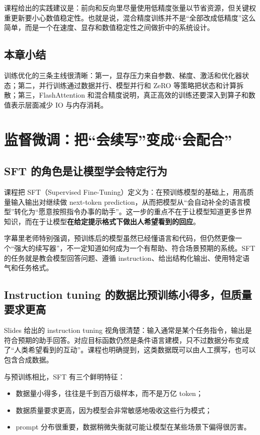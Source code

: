 \documentclass[a4paper]{article}
\begin{document}
课程给出的实践建议是：前向和反向里尽量使用低精度张量以节省资源，但关键权重更新要小心数值稳定性。也就是说，混合精度训练并不是“全部改成低精度”这么简单，而是一个在速度、显存和数值稳定性之间做折中的系统设计。

\subsection{本章小结}
训练优化的三条主线很清晰：第一，显存压力来自参数、梯度、激活和优化器状态；第二，并行训练通过数据并行、模型并行和 ZeRO 等策略把状态和计算拆散；第三，FlashAttention 和混合精度说明，真正高效的训练还要深入到算子和数值表示层面减少 IO 与内存消耗。

\section{监督微调：把“会续写”变成“会配合”}

\subsection{SFT 的角色是让模型学会特定行为}
课程把 SFT（Supervised Fine-Tuning）定义为：在预训练模型的基础上，用高质量输入输出对继续做 next-token prediction，从而把模型从“会自动补全的语言模型”转化为“愿意按照指令办事的助手”。这一步的重点不在于让模型知道更多世界知识，而在于让模型\textbf{在给定提示格式下做出人希望看到的回应}。

字幕里老师特别强调，预训练后的模型虽然已经懂语言和代码，但仍然更像一个“强大的续写器”，不一定知道如何成为一个有帮助、符合场景预期的系统。SFT 的任务就是教会模型回答问题、遵循 instruction、给出结构化输出、使用特定语气和任务格式。

\subsection{Instruction tuning 的数据比预训练小得多，但质量要求更高}
Slides 给出的 instruction tuning 视角很清楚：输入通常是某个任务指令，输出是符合预期的助手回答。对应目标函数仍然是条件语言建模，只不过数据分布变成了“人类希望看到的互动”。课程也明确提到，这类数据既可以由人工撰写，也可以包含合成数据。

与预训练相比，SFT 有三个鲜明特征：
\begin{itemize}
\item 数据量小得多，往往是千到百万级样本，而不是万亿 token；
\item 数据质量要求更高，因为模型会非常敏感地吸收这些行为模式；
\item prompt 分布很重要，数据稍微失衡就可能让模型在某些场景下偏得很厉害。
\end{itemize}
\end{document}
